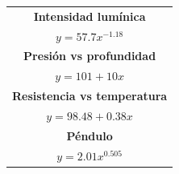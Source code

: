 \documentclass[letter,11pt]{article}
\begin{document}
\begin{center}
\begin{tabular}{|c|c|}
\hline
\multicolumn{2}{|c|}{\textbf{Intensidad lumínica}} \\
\multicolumn{2}{|c|}{$y = 57.7 x^{-1.18}$} \\
\hline
\multicolumn{2}{|c|}{\textbf{Presión vs profundidad}} \\
\multicolumn{2}{|c|}{$y = 101 + 10 x$} \\
\hline
\multicolumn{2}{|c|}{\textbf{Resistencia vs temperatura}} \\
\multicolumn{2}{|c|}{$y = 98.48 + 0.38 x$} \\
\hline
\multicolumn{2}{|c|}{\textbf{Péndulo}} \\
\multicolumn{2}{|c|}{$y = 2.01 x^{0.505}$} \\
\hline
\end{tabular}
\end{center}
\end{document}
